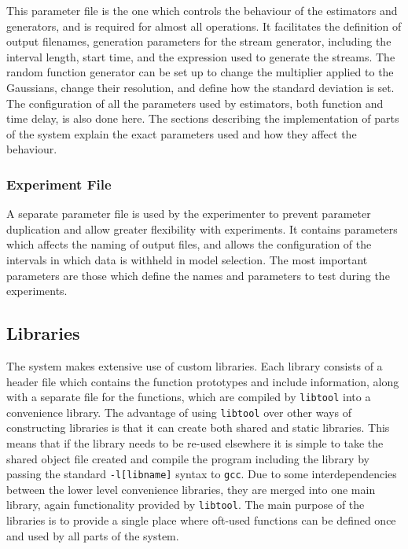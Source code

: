 \documentclass[a4paper,11pt]{article}
\begin{document}
    This parameter file is the one which controls the behaviour of the
    estimators and generators, and is required for almost all operations. It
    facilitates the definition of output filenames, generation parameters for
    the stream generator, including the interval length, start time, and the
    expression used to generate the streams. The random function generator can
    be set up to change the multiplier applied to the Gaussians, change their
    resolution, and define how the standard deviation is set. The configuration
    of all the parameters used by estimators, both function and time delay, is
    also done here. The sections describing the implementation of parts of the
    system explain the exact parameters used and how they affect the behaviour.
\subsubsection{Experiment File}
\label{sec-6-2-2}

    A separate parameter file is used by the experimenter to prevent parameter
    duplication and allow greater flexibility with experiments. It contains
    parameters which affects the naming of output files, and allows the
    configuration of the intervals in which data is withheld in model
    selection. The most important parameters are those which define the names
    and parameters to test during the experiments.
\subsection{Libraries}
\label{sec-6-3}

   The system makes extensive use of custom libraries. Each library consists of
   a header file which contains the function prototypes and include information,
   along with a separate file for the functions, which are compiled by
   \texttt{libtool} into a convenience library. The advantage of using
   \texttt{libtool} over other ways of constructing libraries is that it can
   create both shared and static libraries. This means that if the library needs
   to be re-used elsewhere it is simple to take the shared object file created
   and compile the program including the library by passing the standard
   \texttt{-l[libname]} syntax to \texttt{gcc}. Due to some interdependencies
   between the lower level convenience libraries, they are merged into one main
   library, again functionality provided by \texttt{libtool}. The main purpose
   of the libraries is to provide a single place where oft-used functions can be
   defined once and used by all parts of the system.
\end{document}
